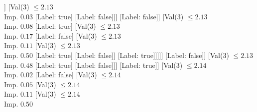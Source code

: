 \documentclass[margin=10pt]{standalone}
\begin{document}
\begin{forest}
																[Val($3$) $ \leq 2.14$ \\ Imp. $0.00$
																	[Val($3$) $ \leq 2.13$ \\ Imp. $0.00$
																		[Label: false]
																		[Val($3$) $ \leq 2.13$ \\ Imp. $0.01$
																			[Val($3$) $ \leq 2.13$ \\ Imp. $0.03$
																				[Val($3$) $ \leq 2.13$ \\ Imp. $0.01$
																					[Val($3$) $ \leq 2.13$ \\ Imp. $0.02$
																						[Val($3$) $ \leq 2.13$ \\ Imp. $0.05$
																							[Val($3$) $ \leq 2.13$ \\ Imp. $0.03$
																								[Val($3$) $ \leq 2.13$ \\ Imp. $0.03$
																									[Val($3$) $ \leq 2.13$ \\ Imp. $0.09$
																										[Label: true]
																										[Label: false]]
																									[Val($3$) $ \leq 2.13$ \\ Imp. $0.03$
																										[Label: true]
																										[Label: false]]]
																								[Label: false]]
																							[Val($3$) $ \leq 2.13$ \\ Imp. $0.08$
																								[Label: true]
																								[Val($3$) $ \leq 2.13$ \\ Imp. $0.17$
																									[Label: false]
																									[Val($3$) $ \leq 2.13$ \\ Imp. $0.11$
																										[Val($3$) $ \leq 2.13$ \\ Imp. $0.50$
																											[Label: true]
																											[Label: false]]
																										[Label: true]]]]]
																						[Label: false]]
																					[Val($3$) $ \leq 2.13$ \\ Imp. $0.48$
																						[Label: true]
																						[Label: false]]]
																				[Label: true]]
																			[Val($3$) $ \leq 2.14$ \\ Imp. $0.02$
																				[Label: false]
																				[Val($3$) $ \leq 2.14$ \\ Imp. $0.05$
																					[Val($3$) $ \leq 2.14$ \\ Imp. $0.11$
																						[Val($3$) $ \leq 2.14$ \\ Imp. $0.50$

\end{forest}
\end{document}
